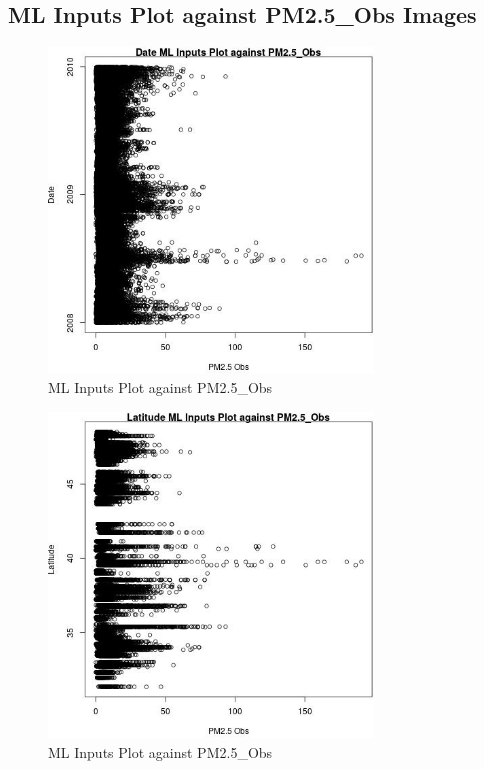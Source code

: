 
\subsection{ML Inputs Plot against PM2.5_Obs Images} 
 

\begin{figure} 
\centering  
\includegraphics[width=0.77\textwidth]{Code_Outputs/Report_ML_input_PM25_Step4_part_e_de_duplicated_aves_DatevPM25_Obs.jpg} 
\caption{\label{fig:Report_ML_input_PM25_Step4_part_e_de_duplicated_avesDatevPM25_Obs}ML Inputs Plot against PM2.5_Obs} 
\end{figure} 
 

\begin{figure} 
\centering  
\includegraphics[width=0.77\textwidth]{Code_Outputs/Report_ML_input_PM25_Step4_part_e_de_duplicated_aves_LatitudevPM25_Obs.jpg} 
\caption{\label{fig:Report_ML_input_PM25_Step4_part_e_de_duplicated_avesLatitudevPM25_Obs}ML Inputs Plot against PM2.5_Obs} 
\end{figure} 
 

